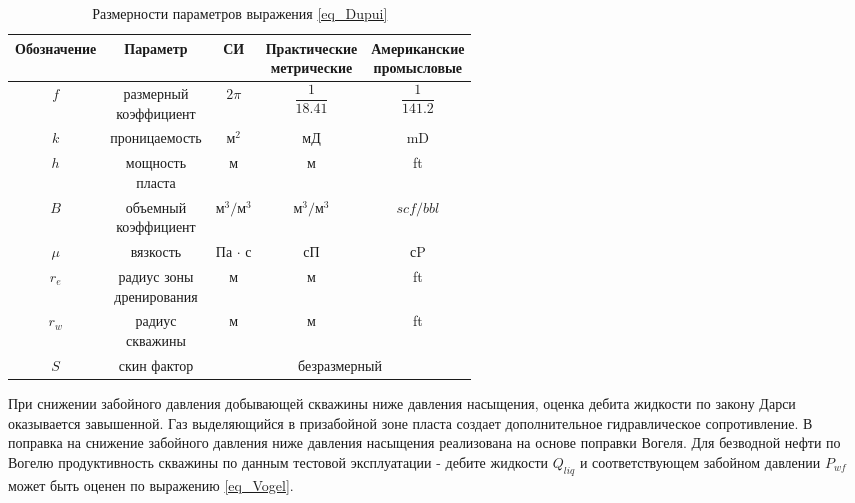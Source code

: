 \begin{table}[H]
	\centering
	\caption{Размерности параметров выражения \ref{eq_Dupui}} \label{tab:dim_Dupui}
	\begin{tabular}{|c|c|c|c|c|}
		\hline
		Обозначение & Параметр   			        	& СИ           & \rnttab{Практические \\ метрические}     & \rnttab{Американские\\ промысловые} \\ \hline
		$f$        & \rnttab{размерный \\ коэффициент} & $2\pi$       & $\dfrac{1}{18.41}$     			      & $\dfrac{1}{141.2}$                      \\ \hline
		$k$        & проницаемость           		    & $\text{м}^2$ & мД                    					  & mD   							    \\ \hline
		$h$        & \rnttab{мощность \\ пласта}       & м            & м                      				  & ft   								    \\ \hline		
		$B$        & \rnttab{объемный \\ коэффициент}  & $\text{м}^3/\text{м}^3$    & $\text{м}^3/\text{м}^3$    & $scf/bbl$    						\\ \hline
		$\mu$      & вязкость                           & Па $\cdot$ с & сП                                       & сP                                  \\ \hline
		$r_e$      & \rnttab{радиус зоны \\ дренирования} & м & м                                       & ft                                  \\ \hline
		$r_w$      & \rnttab{радиус  \\ скважины} & м & м                                       & ft                                  \\ \hline
		$S$        & скин фактор 				   & \multicolumn{3}{c|}{безразмерный}                     \\ \hline
	\end{tabular}
\end{table}
 
 При снижении забойного давления добывающей скважины ниже давления насыщения, оценка дебита жидкости по закону Дарси  оказывается завышенной. Газ выделяющийся в призабойной зоне пласта создает дополнительное гидравлическое сопротивление.  В \unf{} поправка на снижение забойного давления ниже давления насыщения реализована на основе поправки Вогеля. Для безводной нефти по Вогелю продуктивность скважины по данным тестовой эксплуатации - дебите жидкости $Q_{liq}$ и соответствующем забойном давлении $P_{wf}$ может быть оценен по выражению \ref{eq_Vogel}.
 

